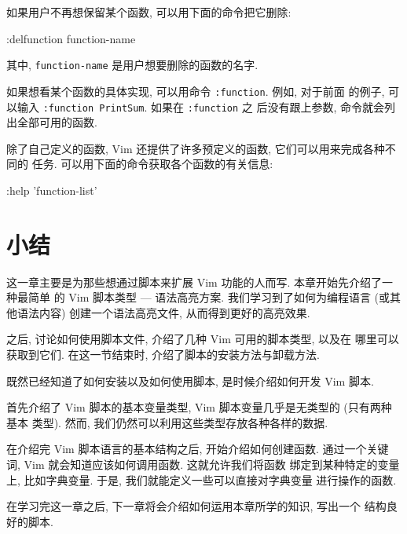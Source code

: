 如果用户不再想保留某个函数, 可以用下面的命令把它删除:
\begin{vimcode}
:delfunction function-name
\end{vimcode}
其中, \texttt{function-name} 是用户想要删除的函数的名字.

\begin{warning}
    如果想看某个函数的具体实现, 可以用命令 \texttt{:function}. 例如, 对于前面
    的例子, 可以输入 \texttt{:function PrintSum}. 如果在 \texttt{:function} 之
    后没有跟上参数, 命令就会列出全部可用的函数.
\end{warning}

除了自己定义的函数, Vim 还提供了许多预定义的函数, 它们可以用来完成各种不同的
任务. 可以用下面的命令获取各个函数的有关信息:
\begin{vimcode}
:help 'function-list'
\end{vimcode}

\section{小结}
\label{sec:basic_vim_scripting_summary}

这一章主要是为那些想通过脚本来扩展 Vim 功能的人而写. 本章开始先介绍了一种最简单
的 Vim 脚本类型 --- 语法高亮方案. 我们学习到了如何为编程语言 (或其他语法内容)
创建一个语法高亮文件, 从而得到更好的高亮效果.

之后, 讨论如何使用脚本文件, 介绍了几种 Vim 可用的脚本类型, 以及在
哪里可以获取到它们. 在这一节结束时, 介绍了脚本的安装方法与卸载方法.

既然已经知道了如何安装以及如何使用脚本, 是时候介绍如何开发 Vim 脚本.

首先介绍了 Vim 脚本的基本变量类型, Vim 脚本变量几乎是无类型的 (只有两种基本
类型). 然而, 我们仍然可以利用这些类型存放各种各样的数据.

在介绍完 Vim 脚本语言的基本结构之后, 开始介绍如何创建函数.
通过一个关键词, Vim 就会知道应该如何调用函数. 这就允许我们将函数
绑定到某种特定的变量上, 比如字典变量. 于是, 我们就能定义一些可以直接对字典变量
进行操作的函数.

在学习完这一章之后, 下一章将会介绍如何运用本章所学的知识, 写出一个
结构良好的脚本.
